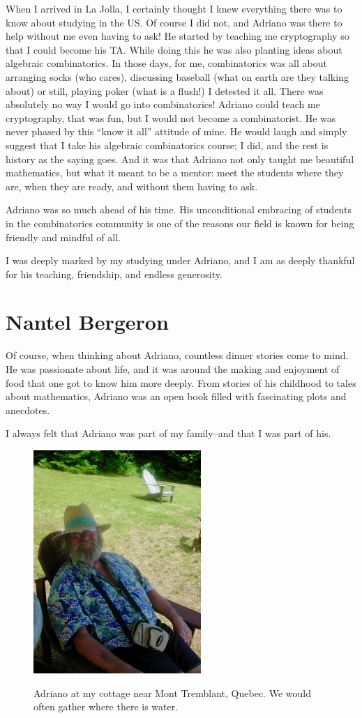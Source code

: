 \documentclass{notices}
\begin{document}
When I arrived in La Jolla, I certainly thought I knew everything there was to know about studying in the US. Of course I did not, and Adriano was there to help without me even having to ask!   He started by teaching me cryptography so that I could become his TA. While doing this he was also planting ideas about algebraic combinatorics. In those days, for me, combinatorics was all about arranging socks (who cares), discussing baseball (what on earth are they talking about) or still, playing poker (what is a flush!) I detested it all. There was absolutely no way I would go into combinatorics! Adriano could teach me cryptography, that was fun, but I would not become a combinatorist. He was never phased by this ``know it all'' attitude of mine. He would laugh and simply suggest that I take his algebraic combinatorics course; I did, and the rest is history as the saying goes. And it was that Adriano not only taught me beautiful mathematics, but what it meant to be a mentor: meet the students where they are, when they are ready, and without them having to ask.

Adriano was so much ahead of his time. His unconditional embracing of students in the combinatorics community is one of the reasons our field is known for being friendly and mindful of all.

I was deeply marked by my studying under Adriano, and I am as deeply thankful for his teaching, friendship, and endless generosity. 

\section*{Nantel Bergeron}
Of course, when thinking about Adriano, countless dinner stories come to mind. He was passionate about life, and it was around the making and enjoyment of food that one got to know him more deeply. From stories of his childhood to tales about mathematics, Adriano was an open book filled with fascinating plots and anecdotes.

I always felt that Adriano was part of my family--and that I was part of his. 

\begin{figure}[h]
\includegraphics[width=2.5in]{Nantel_Bergeron/DSCN3064.jpeg}

{\footnotesize Adriano at my cottage near Mont Tremblant, Quebec. We would often gather where there is water.}
\end{figure}
\end{document}
